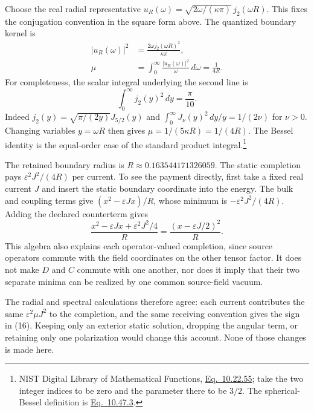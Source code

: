 \documentclass[10pt,twocolumn,letterpaper]{article}
\begin{document}
Choose the real radial representative
$u_R(\omega)=\sqrt{2\omega/(\kappa\pi)}\,j_2(\omega R)$.
This fixes the conjugation convention in the square form above. The
quantized boundary kernel is
\begin{equation}
\begin{aligned}
|u_R(\omega)|^2&=\frac{2\omega j_2(\omega R)^2}{\kappa\pi},\\
\mu&=\int_0^\infty\frac{|u_R(\omega)|^2}{\omega}\,d\omega=\frac1{4R}.
\end{aligned}\tag{17}
\end{equation}
For completeness, the scalar integral underlying the second line is
\[
\int_0^\infty j_2(y)^2\,dy=\frac{\pi}{10}.
\]
Indeed $j_2(y)=\sqrt{\pi/(2y)}J_{5/2}(y)$ and
$\int_0^\infty J_\nu(y)^2\,dy/y=1/(2\nu)$ for $\nu>0$.
Changing variables $y=\omega R$ then gives
$\mu=1/(5\kappa R)=1/(4R)$.
The Bessel identity is the equal-order case of the standard product
integral.\footnote{NIST Digital Library of Mathematical Functions,
\href{https://dlmf.nist.gov/10.22.E55}{Eq.~10.22.55}; take the two
integer indices to be zero and the parameter there to be $3/2$.
The spherical-Bessel definition is
\href{https://dlmf.nist.gov/10.47.E3}{Eq.~10.47.3}.}

The retained boundary radius is $R\approx0.163544171326059$.
The static completion pays $\varepsilon^2J^2/(4R)$ per current.
To see the payment directly, first take a fixed real current $J$ and
insert the static boundary coordinate into the energy.  The bulk and
coupling terms give $(x^2-\varepsilon Jx)/R$, whose minimum is
$-\varepsilon^2J^2/(4R)$.  Adding the declared counterterm gives
\[
\frac{x^2-\varepsilon Jx+\varepsilon^2J^2/4}{R}
=\frac{(x-\varepsilon J/2)^2}{R}.
\]
This algebra also explains each operator-valued completion, since source
operators commute with the field coordinates on the other tensor
factor.  It does not make $D$ and $C$ commute with one another, nor does
it imply that their two separate minima can be realized by one common
source-field vacuum.

The radial and spectral calculations therefore agree: each current
contributes the same $\varepsilon^2\mu J^2$ to the completion, and the
same receiving convention gives the sign in (16).  Keeping only an
exterior static solution, dropping the angular term, or retaining only
one polarization would change this account.  None of those changes is
made here.
\end{document}
